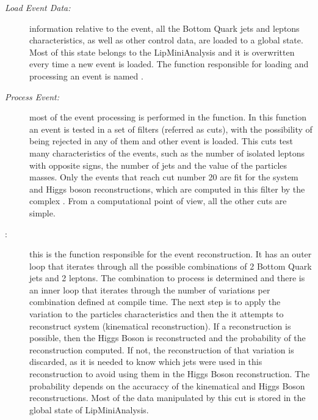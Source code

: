 \begin{description}
	\item[\textit{Load Event Data:}] information relative to the event, all the Bottom Quark jets and leptons characteristics, as well as other control data, are loaded to a global state. Most of this state belongs to the LipMiniAnalysis and it is overwritten every time a new event is loaded. The function responsible for loading and processing an event is named \ttLoop.
	\item[\textit{Process Event:}] most of the event processing is performed in the \ttDoCuts function. In this function an event is tested in a set of filters (referred as cuts), with the possibility of being rejected in any of them and other event is loaded. This cuts test many characteristics of the events, such as the number of isolated leptons with opposite signs, the number of jets and the value of the particles masses. Only the events that reach cut number 20 are fit for the \ttbar system and Higgs boson reconstructions, which are computed in this filter by the complex \ttDilepKinFit. From a computational point of view, all the other cuts are simple.
	\item[\ttDilepKinFit:] this is the function responsible for the event reconstruction. It has an outer loop that iterates through all the possible combinations of 2 Bottom Quark jets and 2 leptons. The combination to process is determined and there is an inner loop that iterates through the number of variations per combination defined at compile time. The next step is to apply the variation to the particles characteristics and then the it attempts to reconstruct \ttbar system (kinematical reconstruction). If a reconstruction is possible, then the Higgs Boson is reconstructed and the probability of the reconstruction computed. If not, the reconstruction of that variation is discarded, as it is needed to know which jets were used in this reconstruction to avoid using them in the Higgs Boson reconstruction. The probability depends on the accuraccy of the kinematical and Higgs Boson reconstructions. Most of the data manipulated by this cut is stored in the global state of LipMiniAnalysis.
\end{description}


